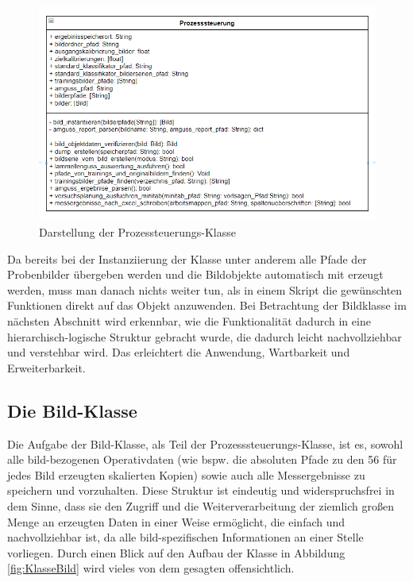 \documentclass[
fontsize=10pt, 
listof = totoc,
parskip = half	
]{report}
\begin{document}
\begin{figure}[H]
	\centering
	\includegraphics[width=\textwidth, height=\textheight, keepaspectratio]{pics/class_runner}
	\caption{Darstellung der Prozessteuerungs-Klasse}
	\label{fig:KlasseProzessteuerung}
\end{figure}

\noindent Da bereits bei der Instanziierung der Klasse unter anderem alle Pfade der Probenbilder übergeben werden und die Bildobjekte automatisch mit erzeugt werden, muss man danach nichts weiter tun, als in einem Skript die gewünschten Funktionen direkt auf das Objekt anzuwenden. Bei Betrachtung der Bildklasse im nächsten Abschnitt wird erkennbar, wie die Funktionalität dadurch in eine hierarchisch-logische Struktur gebracht wurde, die dadurch leicht nachvollziehbar und verstehbar wird. Das erleichtert die Anwendung, Wartbarkeit und Erweiterbarkeit.

\subsection{Die Bild-Klasse}

Die Aufgabe der Bild-Klasse, als Teil der Prozesssteuerungs-Klasse, ist es, sowohl alle bild-bezogenen Operativdaten (wie bspw. die absoluten Pfade zu den 56 für jedes Bild erzeugten skalierten Kopien) sowie auch alle Messergebnisse zu speichern und vorzuhalten. Diese Struktur ist eindeutig und widerspruchsfrei in dem Sinne, dass sie den Zugriff und die Weiterverarbeitung der ziemlich großen Menge an erzeugten Daten in einer Weise ermöglicht, die einfach und nachvollziehbar ist, da alle bild-spezifischen Informationen an einer Stelle vorliegen. Durch einen Blick auf den Aufbau der Klasse in Abbildung \ref{fig:KlasseBild} wird vieles von dem gesagten offensichtlich.
\end{document}
